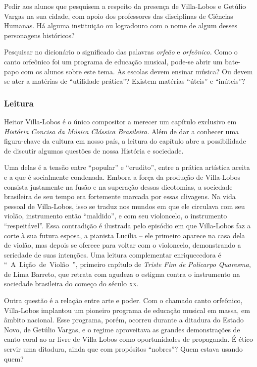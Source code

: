\documentclass[11pt]{extarticle}
\begin{document}
Pedir aos alunos que pesquisem a respeito da presença de Villa-Lobos e
Getúlio Vargas na sua cidade, com apoio dos professores das disciplinas de 
Ciências Humanas. Há alguma instituição ou logradouro com o
nome de algum desses personagens históricos?

Pesquisar no dicionário o significado das palavras \emph{orfeão} e
\emph{orfeônico.} Como o canto orfeônico foi um programa de educação
musical, pode-se abrir um bate-papo com os alunos sobre este tema. As
escolas devem ensinar música? Ou devem se ater a matérias de ``utilidade
prática''? Existem matérias ``úteis'' e ``inúteis''?

\subsubsection{Leitura}

Heitor Villa-Lobos é o único compositor a merecer um capítulo exclusivo
em \emph{História Concisa da Música Clássica Brasileira.} Além de dar a
conhecer uma figura-chave da cultura em nosso país, a leitura do
capítulo abre a possibilidade de discutir algumas questões de nossa
História e sociedade.

Uma delas é a tensão entre ``popular'' e ``erudito'', entre a prática
artística aceita e a que é socialmente condenada. Embora a força da
produção de Villa-Lobos consista justamente na fusão e na superação
dessas dicotomias, a sociedade brasileira de seu tempo era fortemente
marcada por essas clivagens. Na vida pessoal de Villa-Lobos, isso se
traduz nos mundos em que ele circulava com seu violão, instrumento então
``maldido'', e com seu violoncelo, o instrumento ``respeitável''. Essa
contradição é ilustrada pelo episódio em que Villa-Lobos faz a corte à
sua futura esposa, a pianista Lucília -- ele primeiro aparece na casa
dela de violão, mas depois se oferece para voltar com o violoncelo,
demonstrando a seriedade de suas intenções. Uma leitura complementar
enriquecedora é ``~A~Lição~de~Violão~'', primeiro capítulo de
\emph{Triste Fim de Policarpo Quaresma}, de Lima Barreto, que retrata
com agudeza o estigma contra o instrumento na sociedade brasileira do
começo do século \textsc{xx}.

Outra questão é a relação entre arte e poder. Com o chamado canto
orfeônico, Villa-Lobos implantou um pioneiro programa de educação
musical em massa, em âmbito nacional. Esse programa, porém, ocorreu
durante a ditadura do Estado Novo, de Getúlio Vargas, e o regime
aproveitava as grandes demonstrações de canto coral ao ar livre de
Villa-Lobos como oportunidades de propaganda. É ético servir uma
ditadura, ainda que com propósitos ``nobres''? Quem estava usando quem?
\end{document}
